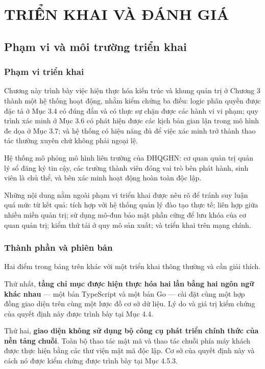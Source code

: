 \chapter{TRIỂN KHAI VÀ ĐÁNH GIÁ}

\section{Phạm vi và môi trường triển khai}

\subsection{Phạm vi triển khai}

Chương này trình bày việc hiện thực hóa kiến trúc và khung quản trị ở Chương 3 thành một hệ thống hoạt động, nhằm kiểm chứng ba điều: logic phân quyền được đặc tả ở Mục 3.4 có đúng đắn và có thực sự chặn được các hành vi vi phạm; quy trình xác minh ở Mục 3.6 có phát hiện được các kịch bản gian lận trong mô hình đe dọa ở Mục 3.7; và hệ thống có hiệu năng đủ để việc xác minh trở thành thao tác thường xuyên chứ không phải ngoại lệ.

Hệ thống mô phỏng mô hình liên trường của ĐHQGHN: cơ quan quản trị quản lý sổ đăng ký tin cậy, các trường thành viên đóng vai trò bên phát hành, sinh viên là chủ thể, và bên xác minh hoạt động hoàn toàn độc lập.

Những nội dung nằm ngoài phạm vi triển khai được nêu rõ để tránh suy luận quá mức từ kết quả: tích hợp với hệ thống quản lý đào tạo thực tế; liên hợp giữa nhiều miền quản trị; sử dụng mô-đun bảo mật phần cứng để lưu khóa của cơ quan quản trị; kiểm thử tải ở quy mô sản xuất; và triển khai trên mạng chính.

\subsection{Thành phần và phiên bản}



Hai điểm trong bảng trên khác với một triển khai thông thường và cần giải thích.

Thứ nhất, \textbf{tầng chỉ mục được hiện thực hóa hai lần bằng hai ngôn ngữ khác nhau} --- một bản TypeScript và một bản Go --- cài đặt cùng một hợp đồng giao diện trên cùng một lược đồ cơ sở dữ liệu. Lý do và giá trị kiểm chứng của quyết định này được trình bày tại Mục 4.4.

Thứ hai, \textbf{giao diện không sử dụng bộ công cụ phát triển chính thức của nền tảng chuỗi}. Toàn bộ thao tác mật mã và thao tác chuỗi phía máy khách được thực hiện bằng các thư viện mật mã độc lập. Cơ sở của quyết định này và cách nó được kiểm chứng được trình bày tại Mục 4.5.3.

